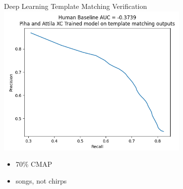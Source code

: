 \begin{frame}{Deep Learning Template Matching Verification}
    \centering
    \includegraphics[height=0.7\textheight,width=0.7\textwidth,keepaspectratio]{images/TMV-precision-recall.png}
    \begin{itemize}
        \item 70\% CMAP
        \item songs, not chirps
    \end{itemize}
\end{frame}